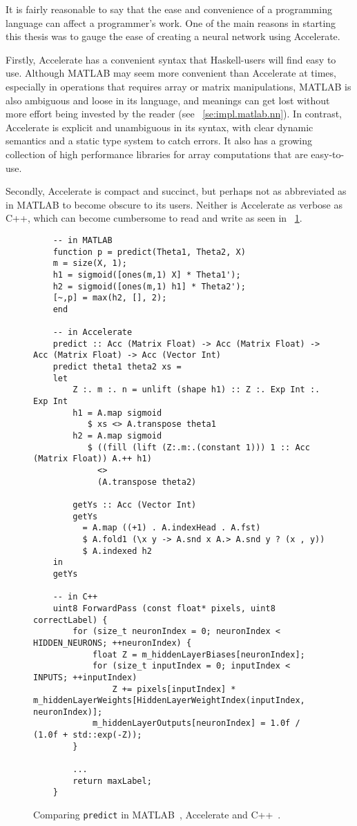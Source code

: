 It is fairly reasonable to say that the ease and convenience of a programming language can affect a programmer's work. One of the main reasons in starting this thesis was to gauge the ease of creating a neural network using Accelerate.

Firstly, Accelerate has a convenient syntax that Haskell-users will find easy to use. Although MATLAB may seem more convenient than Accelerate at times, especially in operations that requires array or matrix manipulations, MATLAB is also ambiguous and loose in its language, and meanings can get lost without more effort being invested by the reader (see ~\ref{se:impl.matlab.nn}). In contrast, Accelerate is explicit and unambiguous in its syntax, with clear dynamic semantics and a static type system to catch errors. It also has a growing collection of high performance libraries for array computations that are easy-to-use.

Secondly, Accelerate is compact and succinct, but perhaps not as abbreviated as in MATLAB to become obscure to its users. Neither is Accelerate as verbose as C++, which can become cumbersome to read and write as seen in ~\ref{fig:eval.syntax.predict}.

\begin{figure}
  \begin{lstlisting}
	-- in MATLAB
	function p = predict(Theta1, Theta2, X)
	m = size(X, 1);
	h1 = sigmoid([ones(m,1) X] * Theta1');
	h2 = sigmoid([ones(m,1) h1] * Theta2');
	[~,p] = max(h2, [], 2);
	end
	  	
	-- in Accelerate  	
  	predict :: Acc (Matrix Float) -> Acc (Matrix Float) -> Acc (Matrix Float) -> Acc (Vector Int)
    predict theta1 theta2 xs = 
    let
        Z :. m :. n = unlift (shape h1) :: Z :. Exp Int :. Exp Int
        h1 = A.map sigmoid 
           $ xs <> A.transpose theta1                
        h2 = A.map sigmoid 
           $ ((fill (lift (Z:.m:.(constant 1))) 1 :: Acc (Matrix Float)) A.++ h1)
             <>
             (A.transpose theta2)

        getYs :: Acc (Vector Int)
        getYs
          = A.map ((+1) . A.indexHead . A.fst)
          $ A.fold1 (\x y -> A.snd x A.> A.snd y ? (x , y))
          $ A.indexed h2
    in
    getYs
  	
  	-- in C++
	uint8 ForwardPass (const float* pixels, uint8 correctLabel) {
        for (size_t neuronIndex = 0; neuronIndex < HIDDEN_NEURONS; ++neuronIndex) {
            float Z = m_hiddenLayerBiases[neuronIndex];
            for (size_t inputIndex = 0; inputIndex < INPUTS; ++inputIndex)
                Z += pixels[inputIndex] * m_hiddenLayerWeights[HiddenLayerWeightIndex(inputIndex, neuronIndex)];
            m_hiddenLayerOutputs[neuronIndex] = 1.0f / (1.0f + std::exp(-Z));
        }
        
        ... 
        return maxLabel;
    }
  \end{lstlisting}
  \caption{Comparing \texttt{predict} in MATLAB~\cite{Ng12}, Accelerate and C++~\cite{Wol17}.}
  \label{fig:eval.syntax.predict}
\end{figure}

